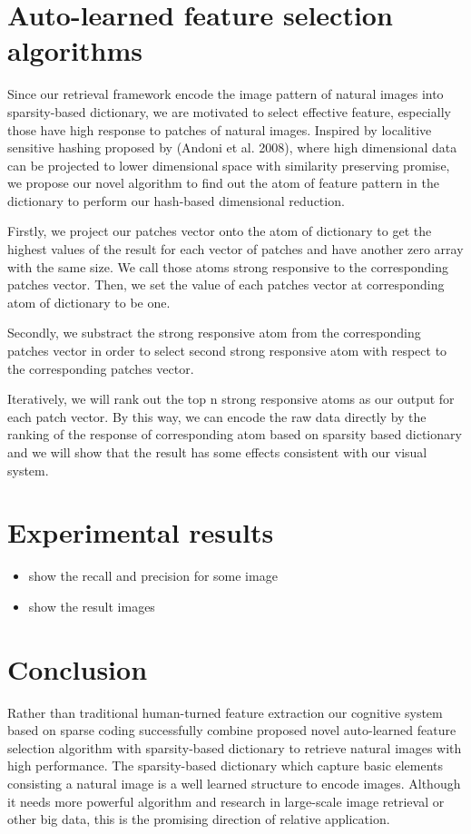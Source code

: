 \documentclass[letterpaper]{article}
\begin{document}
\section{Auto-learned feature selection algorithms}
Since our retrieval framework encode the image pattern of natural images into sparsity-based dictionary, we are motivated to select effective feature, especially those have high response to patches of natural images. Inspired by localitive sensitive hashing proposed by (Andoni et al. 2008), where high dimensional data can be projected to lower dimensional space with similarity preserving promise, we propose our novel algorithm to find out the atom of feature pattern in the dictionary to perform our hash-based dimensional reduction.

Firstly, we project our patches vector onto the atom of dictionary to get the highest values of the result for each vector of patches and have another zero array with the same size. We call those atoms strong responsive to the corresponding patches vector. Then, we set the value of each patches vector at corresponding atom of dictionary to be one.

Secondly, we substract the strong responsive atom from the corresponding patches vector in order to select second strong responsive atom with respect to the corresponding patches vector.

Iteratively, we will rank out the top n strong responsive atoms as our output for each patch vector. By this way, we can encode the raw data directly by the ranking of the response of corresponding atom based on sparsity based dictionary and we will show that the result has some effects consistent with our visual system.

\section{Experimental results}

\begin{itemize}
\item show the recall and precision for some image
\item show the result images
\end{itemize}

\section{Conclusion}
Rather than traditional human-turned feature extraction our cognitive system based on sparse coding successfully combine proposed novel auto-learned feature selection algorithm with sparsity-based dictionary to retrieve natural images with high performance. The sparsity-based dictionary which capture basic elements consisting a natural image is a well learned structure to encode images. Although it needs more powerful algorithm and research in large-scale image retrieval or other big data, this is the promising direction of relative application.  
\end{document}
